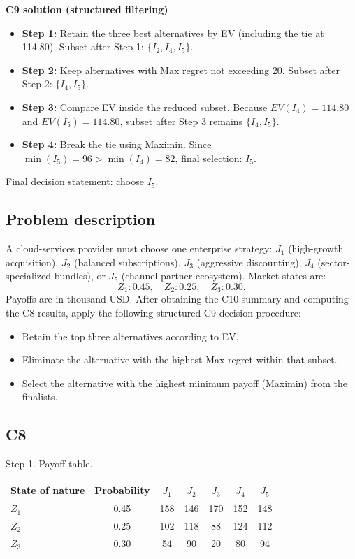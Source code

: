 \begin{ExamProblems}
		\textbf{C9 solution (structured filtering)}
		\begin{itemize}
			\item \textbf{Step 1:} Retain the three best alternatives by EV (including the tie at 114.80). Subset after Step 1: $\{I_2,I_4,I_5\}$.
			\item \textbf{Step 2:} Keep alternatives with Max regret not exceeding 20. Subset after Step 2: $\{I_4,I_5\}$.
			\item \textbf{Step 3:} Compare EV inside the reduced subset. Because $EV(I_4)=114.80$ and $EV(I_5)=114.80$, subset after Step 3 remains $\{I_4,I_5\}$.
			\item \textbf{Step 4:} Break the tie using Maximin. Since $\min(I_5)=96>\min(I_4)=82$, final selection: $I_5$.
		\end{itemize}
		Final decision statement: choose $I_5$.

		\newpage
		\item
		\subsection*{Problem description}
		A cloud-services provider must choose one enterprise strategy:
		$J_1$ (high-growth acquisition), $J_2$ (balanced subscriptions), $J_3$ (aggressive discounting), $J_4$ (sector-specialized bundles), or $J_5$ (channel-partner ecosystem).
		Market states are:
		\[
		Z_1:0.45,\quad Z_2:0.25,\quad Z_3:0.30.
		\]
		Payoffs are in thousand USD.
		After obtaining the C10 summary and computing the C8 results, apply the following structured C9 decision procedure:
		\begin{itemize}
			\item Retain the top three alternatives according to EV.
			\item Eliminate the alternative with the highest Max regret within that subset.
			\item Select the alternative with the highest minimum payoff (Maximin) from the finalists.
		\end{itemize}

		\subsection*{C8}
		Step 1. Payoff table.
		\begin{center}
			\begin{tabular}{l c c c c c c}
				\toprule
				State of nature & Probability & $J_1$ & $J_2$ & $J_3$ & $J_4$ & $J_5$ \\
				\midrule
				$Z_1$ & 0.45 & 158 & 146 & 170 & 152 & 148 \\
				$Z_2$ & 0.25 & 102 & 118 & 88 & 124 & 112 \\
				$Z_3$ & 0.30 & 54 & 90 & 20 & 80 & 94 \\
				\bottomrule
			\end{tabular}
		\end{center}


\end{ExamProblems}

